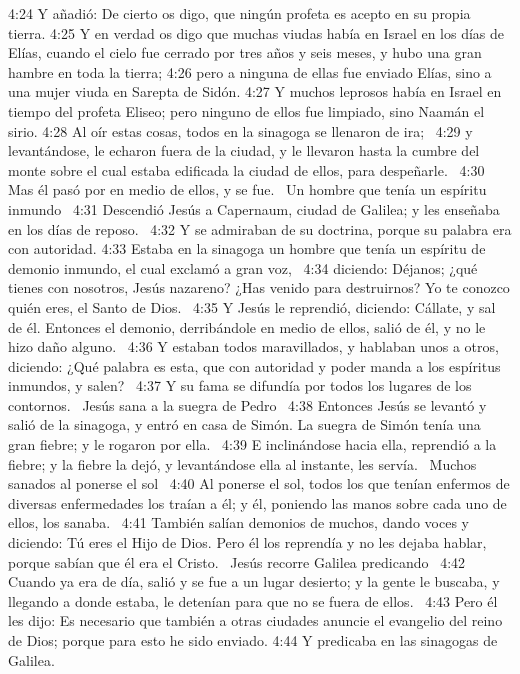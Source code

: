 4:24 Y añadió: De cierto os digo, que ningún profeta es acepto en su propia tierra. 
4:25 Y en verdad os digo que muchas viudas había en Israel en los días de Elías, cuando el cielo fue cerrado por tres años y seis meses, y hubo una gran hambre en toda la tierra; 
4:26 pero a ninguna de ellas fue enviado Elías, sino a una mujer viuda en Sarepta de Sidón. 
4:27 Y muchos leprosos había en Israel en tiempo del profeta Eliseo; pero ninguno de ellos fue limpiado, sino Naamán el sirio. 
4:28 Al oír estas cosas, todos en la sinagoga se llenaron de ira;  
4:29 y levantándose, le echaron fuera de la ciudad, y le llevaron hasta la cumbre del monte sobre el cual estaba edificada la ciudad de ellos, para despeñarle.  
4:30 Mas él pasó por en medio de ellos, y se fue.  
Un hombre que tenía un espíritu inmundo   
4:31 Descendió Jesús a Capernaum, ciudad de Galilea; y les enseñaba en los días de reposo.  
4:32 Y se admiraban de su doctrina, porque su palabra era con autoridad. 
4:33 Estaba en la sinagoga un hombre que tenía un espíritu de demonio inmundo, el cual exclamó a gran voz,  
4:34 diciendo: Déjanos; ¿qué tienes con nosotros, Jesús nazareno? ¿Has venido para destruirnos? Yo te conozco quién eres, el Santo de Dios.  
4:35 Y Jesús le reprendió, diciendo: Cállate, y sal de él. Entonces el demonio, derribándole en medio de ellos, salió de él, y no le hizo daño alguno.  
4:36 Y estaban todos maravillados, y hablaban unos a otros, diciendo: ¿Qué palabra es esta, que con autoridad y poder manda a los espíritus inmundos, y salen?  
4:37 Y su fama se difundía por todos los lugares de los contornos.  
Jesús sana a la suegra de Pedro   
4:38 Entonces Jesús se levantó y salió de la sinagoga, y entró en casa de Simón. La suegra de Simón tenía una gran fiebre; y le rogaron por ella.  
4:39 E inclinándose hacia ella, reprendió a la fiebre; y la fiebre la dejó, y levantándose ella al instante, les servía.  
Muchos sanados al ponerse el sol   
4:40 Al ponerse el sol, todos los que tenían enfermos de diversas enfermedades los traían a él; y él, poniendo las manos sobre cada uno de ellos, los sanaba.  
4:41 También salían demonios de muchos, dando voces y diciendo: Tú eres el Hijo de Dios. Pero él los reprendía y no les dejaba hablar, porque sabían que él era el Cristo.  
Jesús recorre Galilea predicando  
4:42 Cuando ya era de día, salió y se fue a un lugar desierto; y la gente le buscaba, y llegando a donde estaba, le detenían para que no se fuera de ellos.  
4:43 Pero él les dijo: Es necesario que también a otras ciudades anuncie el evangelio del reino de Dios; porque para esto he sido enviado. 
4:44 Y predicaba en las sinagogas de Galilea.  
